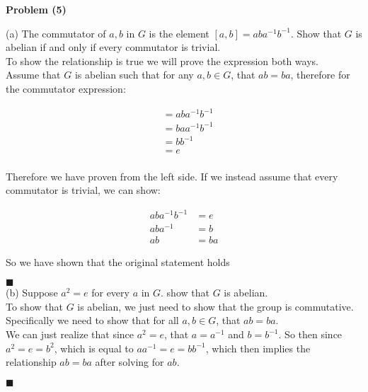 \documentclass[20pt]{article}
\begin{document}
\noindent
\textbf{Problem (5)}\\
\begin{text}
    (a) The commutator of $a, b$ in $G$ is the element $[a, b] = aba^{-1}b^{-1}$. Show that $G$ is abelian if and only if every commutator is trivial.\\
    
    \noindent
    To show the relationship is true we will prove the expression both ways.\\
    
    \noindent
    Assume that $G$ is abelian such that for any $a, b \in G$, that $ab = ba$, therefore for the commutator expression:
    
    \begin{align}
        [a,b] &= aba^{-1}b^{-1}\nonumber\\
        &= baa^{-1}b^{-1}\nonumber\tag{Since $ab = ba$}\\
        &= bb^{-1}\nonumber\\
        &= e\tag{Where $e$ is an identity element in $G$}
    \end{align}\\
    
    \noindent
    Therefore we have proven from the left side. If we instead assume that every commutator is trivial, we can show:
    
    \begin{align}
        aba^{-1}b^{-1} &= e\nonumber\\
        aba^{-1} &= b\nonumber\\
        ab &= ba\nonumber
    \end{align}
    
    \noindent
    So we have shown that the original statement holds
    
    \hfill $\blacksquare$
    \\

    \noindent
    (b) Suppose $a^2 = e$ for every $a$ in $G$. show that $G$ is abelian.\\
    
    \noindent
    To show that $G$ is abelian, we just need to show that the group is commutative. Specifically we need to show that for all $a, b \in G$, that $ab = ba$.\\
    
    \noindent
    We can just realize that since $a^2 = e$, that $a = a^{-1}$ and $b = b^{-1}$. So then since $a^2 = e = b^2$, which is equal to $aa^{-1} = e = bb^{-1}$, which then implies the relationship $ab = ba$ after solving for $ab$.
    
    \hfill $\blacksquare$
\end{text}
\end{document}
